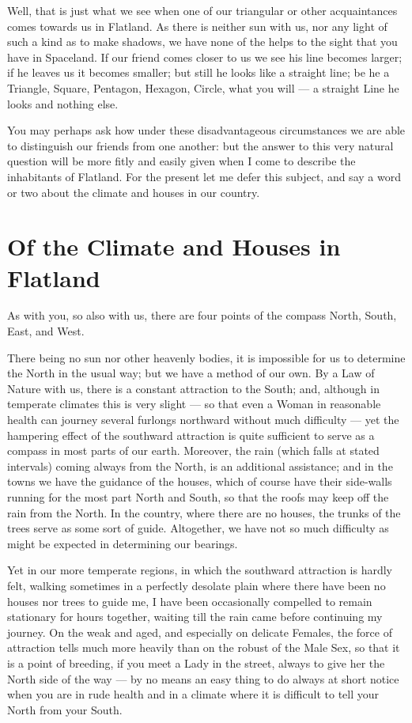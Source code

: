 \documentclass[12pt, a4paper, twoside]{memoir}
\begin{document}
Well, that is just what we see when one of our triangular or other
acquaintances comes towards us in Flatland. As there is neither sun with us,
nor any light of such a kind as to make shadows, we have none of the helps to
the sight that you have in Spaceland. If our friend comes closer to us we see
his line becomes larger; if he leaves us it becomes smaller; but still he
looks like a straight line; be he a Triangle, Square, Pentagon, Hexagon,
Circle, what you will --- a straight Line he looks and nothing else.

You may perhaps ask how under these disadvantageous circumstances we are able
to distinguish our friends from one another: but the answer to this very
natural question will be more fitly and easily given when I come to describe
the inhabitants of Flatland. For the present let me defer this subject, and
say a word or two about the climate and houses in our country.










\chapter{Of the Climate and Houses in Flatland}
As with you, so also with us, there are four points of the compass North,
South, East, and West.

There being no sun nor other heavenly bodies,
it is impossible for us to determine the North in the usual way; but we have a
method of our own. By a Law of Nature with us, there is a constant attraction
to the South; and, although in temperate climates this is very slight --- so
that even a Woman in reasonable health can journey several furlongs northward
without much difficulty --- yet the hampering effect of the southward attraction
is quite sufficient to serve as a compass in most parts of our earth.
Moreover, the rain (which falls at stated intervals) coming always from the
North, is an additional assistance; and in the towns we have the guidance of
the houses, which of course have their side-walls running for the most part
North and South, so that the roofs may keep off the rain from the North. In
the country, where there are no houses, the trunks of the trees serve as some
sort of guide. Altogether, we have not so much difficulty as might be expected
in determining our bearings.

Yet in our more temperate regions, in which the southward attraction is hardly
felt, walking sometimes in a perfectly desolate plain where there have been no
houses nor trees to guide me, I have been occasionally compelled to remain
stationary for hours together, waiting till the rain came before continuing my
journey. On the weak and aged, and especially on delicate Females, the force
of attraction tells much more heavily than on the robust of the Male Sex, so
that it is a point of breeding, if you meet a Lady in the street, always to
give her the North side of the way --- by no means an easy thing to do always at
short notice when you are in rude health and in a climate where it is
difficult to tell your North from your South.
\end{document}
